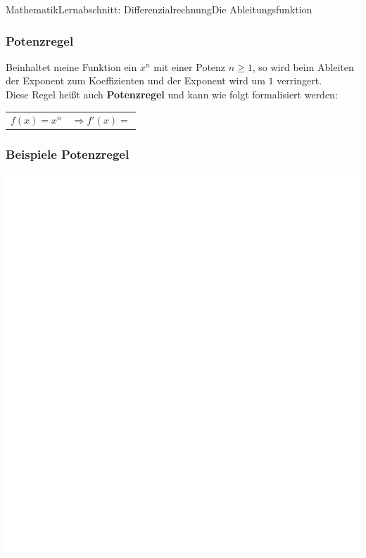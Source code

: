 \documentclass[11pt,twocolumn,oneside,openany,headings=optiontotoc,11pt,numbers=noenddot]{article}
\begin{document}
\begin{worksheet}{Mathematik}{Lernabschnitt: Differenzialrechnung}{Die Ableitungsfunktion}
		\subsubsection{Potenzregel}
		Beinhaltet meine Funktion ein \(x^n\) mit einer Potenz \(n \geq 1\), so wird beim Ableiten der Exponent zum Koeffizienten und der Exponent wird um \(1\) verringert.\\
		Diese Regel heißt auch \textbf{Potenzregel} und kann wie folgt formalisiert werden:
		\begin{framed}
			\noindent
			\begin{tabularx}{0.7\textwidth}{lX}
				\(f(x) = x^n\) & \(\Rightarrow f'(x) = \)
			\end{tabularx}
		\end{framed}
		\subsubsection*{Beispiele Potenzregel}
		\includegraphics[scale=0.2]{../../empty.jpg}\\

\end{worksheet}
\end{document}
